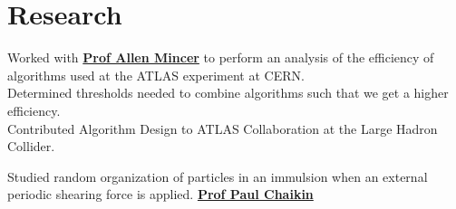 

\section{Research}
Worked with \textbf{\href{https://as.nyu.edu/content/nyu-as/as/faculty/allen-mincer.html}{Prof Allen Mincer}} 
to perform an analysis of the efficiency of algorithms used at the ATLAS
experiment at CERN. \\
Determined thresholds needed to combine algorithms such that we get a higher
efficiency. \\
Contributed Algorithm Design to ATLAS Collaboration at the Large Hadron
Collider.
\sectionsep

Studied random organization of particles in an immulsion when an external periodic shearing force is applied.
\textbf{\href{http://www.physics.nyu.edu/~pc86/people/chaikin.html}{Prof Paul Chaikin}} 
\sectionsep
